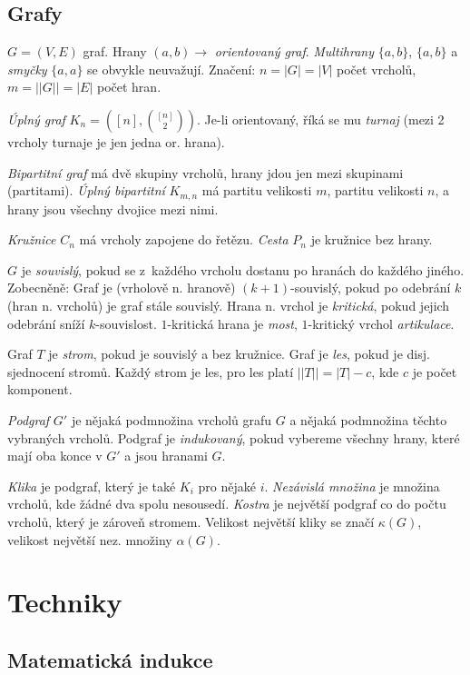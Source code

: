 \subsection{Grafy}

$G = (V,E)$ graf. Hrany $(a,b) \rightarrow$ {\it orientovaný graf}.
{\it Multihrany} $\{a,b\}$, $\{a,b\}$ a {\it smyčky} $\{a,a\}$ se obvykle neuvažují.
Značení: $n = |G| = |V|$ počet vrcholů, $m = ||G|| = |E|$ počet hran.

{\it Úplný graf} $K_n = ([n],{[n] \choose 2})$. Je-li orientovaný, říká
se mu {\it turnaj} (mezi 2 vrcholy turnaje je jen jedna or. hrana).

{\it Bipartitní graf} má dvě skupiny vrcholů, hrany jdou jen mezi skupinami (partitami).
{\it Úplný bipartitní} $K_{m,n}$ má partitu velikosti $m$, partitu velikosti $n$, a hrany
jsou všechny dvojice mezi nimi.

{\it Kružnice} $C_n$ má vrcholy zapojene do řetězu. {\it Cesta} $P_n$
je kružnice bez hrany.

$G$ je {\it souvislý}, pokud se z~každého vrcholu dostanu po hranách do každého
jiného. Zobecněně: Graf je (vrholově n. hranově) $(k+1)$-souvislý, pokud po odebrání
$k$ (hran n. vrcholů) je graf stále souvislý. Hrana n. vrchol je {\it kritická}, pokud jejich
odebrání sníží $k$-souvislost. $1$-kritická hrana je {\it most}, $1$-kritický vrchol
{\it artikulace}.

Graf $T$ je {\it strom}, pokud je souvislý a bez kružnice. Graf je {\it les}, pokud je
disj. sjednocení stromů. Každý strom je les, pro les platí $||T|| = |T| -c$, kde $c$
je počet komponent.

{\it Podgraf} $G'$ je nějaká podmnožina vrcholů grafu $G$ a nějaká podmnožina
těchto vybraných vrcholů. Podgraf je {\it indukovaný}, pokud vybereme všechny hrany,
které mají oba konce v $G'$ a jsou hranami $G$.

{\it Klika} je podgraf, který je také $K_i$ pro nějaké $i$. {\it Nezávislá množina}
je množina vrcholů, kde žádné dva spolu nesousedí. {\it Kostra} je největší podgraf co
do počtu vrcholů, který je zároveň stromem. Velikost největší kliky se značí
$\kappa(G)$, velikost největší nez. množiny $\alpha(G)$.

\vfill\eject
\section{Techniky}

\subsection{Matematická indukce}

